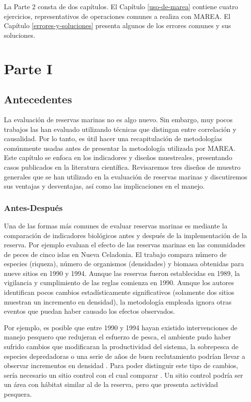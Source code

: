 \documentclass[]{krantz}
\begin{document}
La Parte 2 consta de dos capítulos. El Capítulo \ref{uso-de-marea}
contiene cuatro ejercicios, representativos de operaciones comunes a
realiza con MAREA. El Capítulo \ref{errores-y-soluciones} presenta
algunos de los errores comunes y sus soluciones.

\hypertarget{part-parte-i}{%
\part{Parte I}\label{part-parte-i}}

\hypertarget{antecedentes}{%
\chapter{Antecedentes}\label{antecedentes}}

La evaluación de reservas marinas no es algo nuevo. Sin embargo, muy
pocos trabajos las han evaluado utilizando técnicas que distingan entre
correlación y causalidad. Por lo tanto, es útil hacer una recapitulación
de metodologías comúnmente usadas antes de presentar la metodología
utilizada por MAREA. Este capítulo se enfoca en los indicadores y
diseños muestreales, presentando casos publicados en la literatura
científica. Revisaremos tres diseños de muestro generales que se han
utilizado en la evaluación de reservas marinas y discutiremos sus
ventajas y desventajas, así como las implicaciones en el manejo.

\hypertarget{antes-despues}{%
\section{Antes-Después}\label{antes-despues}}

Una de las formas más comunes de evaluar reservas marinas es mediante la
comparación de indicadores biológicos antes y después de la
implementación de la reserva. Por ejemplo \citet{wantiez_1997} evaluan
el efecto de las reservas marinas en las comunidades de peces de cinco
islas en Nueva Celadonia. El trabajo compara número de especies
(riqueza), número de organismos (densidades) y biomasa obtenidas para
nueve sitios en 1990 y 1994. Aunque las reservas fueron establecidas en
1989, la vigilancia y cumplimiento de las reglas comienza en 1990.
Aunque los autores identifican pocos cambios estadísticamente
significativos (solamente dos sitios muestran un incremento en
densidad), la metodología empleada ignora otras eventos que puedan haber
causado los efectos observados.

Por ejemplo, es posible que entre 1990 y 1994 hayan existido
intervenciones de manejo pesquero que redujeran el esfuerzo de pesca, el
ambiente pudo haber sufrido cambios que modificaran la productividad del
sistema, la sobrepesca de especies depredadoras o una serie de años de
buen reclutamiento podrían llevar a observar incrementos en densidad
\citep{szuwalski_2017, chavez_2003}. Para poder distinguir este tipo de
cambios, sería necesario un sitio control con el cual comparar
\citep{betti_2017}. Un sitio control podría ser un área con hábitat
similar al de la reserva, pero que presenta actividad pesquera.
\end{document}
